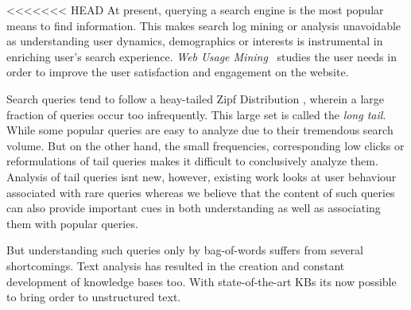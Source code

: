 <<<<<<< HEAD
At present, querying a search engine is the most popular means to find information. This makes
search log mining or analysis unavoidable as understanding user dynamics, demographics or interests
is instrumental in enriching user's search experience. \emph{Web Usage Mining}~\cite{silvestri2010mining}  
studies the user needs in order to improve the user satisfaction and engagement on the website. 

Search queries tend to follow a heay-tailed Zipf Distribution \cite{baeza2007impact}, wherein a large 
fraction of queries occur too infrequently. This large set is called the \emph{long tail}. While some 
popular queries  are easy to analyze due to their tremendous search volume. 
But on the other hand, the small frequencies, corresponding low clicks or reformulations 
of tail queries makes it difficult to conclusively analyze them. Analysis of tail queries isnt new, 
however, existing work \cite{Doug2007Sig,Goel2010Wsdm} looks at user behaviour associated with
rare queries whereas we believe that the content of such queries can also provide important cues in both
understanding as well as associating them with popular queries. 

But understanding such queries only by bag-of-words suffers from several shortcomings.  
Text analysis has resulted in the creation and constant development of knowledge bases too. With 
state-of-the-art KBs its now possible to bring order to unstructured text.  




